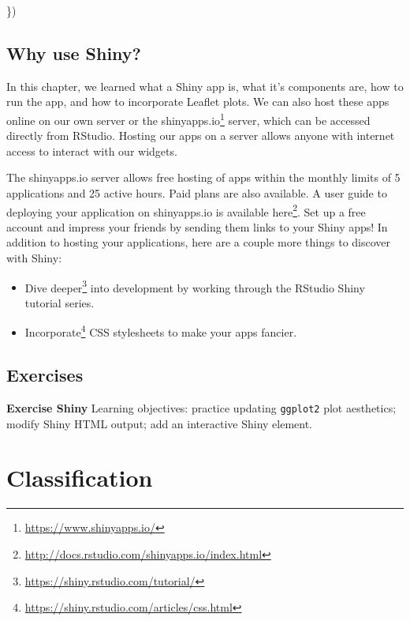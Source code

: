 \documentclass[
]{krantz}
\makeatletter
\newenvironment{Shaded}{\begin{snugshade}}{\end{snugshade}}
\newcommand{\NormalTok}[1]{#1}
\providecommand{\tightlist}{%
  \setlength{\itemsep}{0pt}\setlength{\parskip}{0pt}}
\renewcommand{\href}[2]{#2\footnote{\url{#1}}}
\newenvironment{kframe}{%
\medskip{}
\setlength{\fboxsep}{.8em}
 \def\at@end@of@kframe{}%
 \ifinner\ifhmode%
  \def\at@end@of@kframe{\end{minipage}}%
  \begin{minipage}{\columnwidth}%
 \fi\fi%
 \def\FrameCommand##1{\hskip\@totalleftmargin \hskip-\fboxsep
 \colorbox{shadecolor}{##1}\hskip-\fboxsep
     \hskip-\linewidth \hskip-\@totalleftmargin \hskip\columnwidth}%
 \MakeFramed {\advance\hsize-\width
   \@totalleftmargin\z@ \linewidth\hsize
   \@setminipage}}%
 {\par\unskip\endMakeFramed%
 \at@end@of@kframe}
\renewenvironment{Shaded}{\begin{kframe}}{\end{kframe}}
\makeatother
\begin{document}
\begin{Shaded}
\begin{Highlighting}[]
\NormalTok{  \})}
\end{Highlighting}
\end{Shaded}

\hypertarget{why-use-shiny}{%
\section{Why use Shiny?}\label{why-use-shiny}}

In this chapter, we learned what a Shiny app is, what it's components are, how to run the app, and how to incorporate Leaflet plots. We can also host these apps online on our own server or the \href{https://www.shinyapps.io/}{shinyapps.io} server, which can be accessed directly from RStudio. Hosting our apps on a server allows anyone with internet access to interact with our widgets.

The shinyapps.io server allows free hosting of apps within the monthly limits of 5 applications and 25 active hours. Paid plans are also available. A user guide to deploying your application on shinyapps.io is available \href{http://docs.rstudio.com/shinyapps.io/index.html}{here}. Set up a free account and impress your friends by sending them links to your Shiny apps! In addition to hosting your applications, here are a couple more things to discover with Shiny:

\begin{itemize}
\tightlist
\item
  \href{https://shiny.rstudio.com/tutorial/}{Dive deeper} into development by working through the RStudio Shiny tutorial series.
\item
  \href{https://shiny.rstudio.com/articles/css.html}{Incorporate} CSS stylesheets to make your apps fancier.
\end{itemize}

\hypertarget{shinyEx}{%
\section{Exercises}\label{shinyEx}}

\textbf{Exercise Shiny} Learning objectives: practice updating \texttt{ggplot2} plot aesthetics; modify Shiny HTML output; add an interactive Shiny element.

\hypertarget{classification}{%
\chapter{Classification}\label{classification}}
\end{document}

